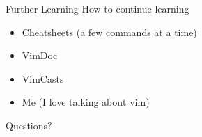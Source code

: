 \documentclass{beamer}
\begin{document}
            \begin{frame}{Further Learning}
                How to continue learning
                \begin{itemize}
                    \item Cheatsheets (a few commands at a time)
                    \item VimDoc
                    \item VimCasts
                    \pause
                    \item Me \pause (I love talking about vim)
                \end{itemize}
            \end{frame}

            \begin{frame}{Questions?}
            \end{frame}
\end{document}
